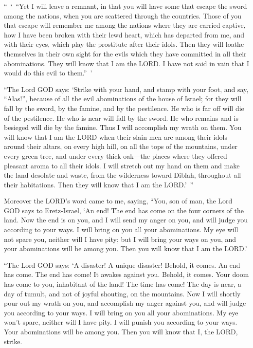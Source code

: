 \myverse{}“ ‘ “Yet I will leave a remnant, in that you will have some that
escape the sword among the nations, when you are scattered through the countries.
\myverse{}Those of you that escape will remember me among the nations where they are carried
captive, how I have been broken with their lewd heart, which has departed from me, and with their eyes,
which play the prostitute after their idols. Then they will loathe themselves in their own sight for the
evils which they have committed in all their abominations.
\myverse{}They will know that I am the LORD. I have not said in vain that I would do
this evil to them.” ’

\myverse{}“The Lord GOD says: ‘Strike with your hand, and stamp with your
foot, and say, “Alas!”, because of all the evil abominations of the house of Israel; for they will fall
by the sword, by the famine, and by the pestilence.
\myverse{}He who is far off will die of the pestilence. He who is near will fall by
the sword. He who remains and is besieged will die by the famine. Thus I will accomplish my wrath on them.
\myverse{}You will know that I am the LORD when their slain men are among their idols
around their altars, on every high hill, on all the tops of the mountains, under every green tree, and
under every thick oak—the places where they offered pleasant aroma to all their idols.
\myverse{}I will stretch out my hand on them and make the land desolate and waste, from
the wilderness toward Diblah, throughout all their habitations. Then they will know that I am the LORD.’ ”



\mychapter{} \myverse*{}Moreover the LORD’s word came to me, saying,
\myverse{}“You, son of man, the Lord GOD says to Eretz-Israel, ‘An end! The end has come
on the four corners of the land.
\myverse{}Now the end is on you, and I will send my anger on you, and will judge you according
to your ways. I will bring on you all your abominations.
\myverse{}My eye will not spare you, neither will I have pity; but I will bring your ways
on you, and your abominations will be among you. Then you will know that I am the LORD.’

\myverse{}“The Lord GOD says: ‘A disaster! A unique disaster! Behold, it
comes.
\myverse{}An end has come. The end has come! It awakes against you. Behold, it comes.
\myverse{}Your doom has come to you, inhabitant of the land! The time has come! The day
is near, a day of tumult, and not of joyful shouting, on the mountains.
\myverse{}Now I will shortly pour out my wrath on you, and accomplish my anger against
you, and will judge you according to your ways. I will bring on you all your abominations.
\myverse{}My eye won’t spare, neither will I have pity. I will punish you according to
your ways. Your abominations will be among you. Then you will know that I, the LORD, strike.

